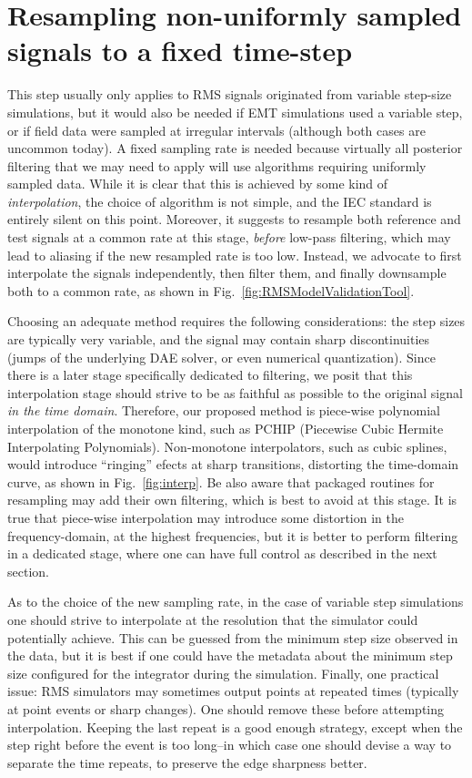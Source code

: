 \documentclass[11pt, a4paper, twoside, titlepage]{article}
\begin{document}
\section{Resampling non-uniformly sampled signals to a fixed time-step}
This step usually only applies to RMS signals originated from variable step-size
simulations, but it would also be needed if EMT simulations used a variable
step, or if field data were sampled at irregular intervals (although both cases
are uncommon today). A fixed sampling rate is needed because virtually all
posterior filtering that we may need to apply will use algorithms requiring
uniformly sampled data. While it is clear that this is achieved by some kind of
\emph{interpolation}, the choice of algorithm is not simple, and the IEC
standard is entirely silent on this point.  Moreover, it suggests to resample
both reference and test signals at a common rate at this stage, \emph{before}
low-pass filtering, which may lead to aliasing if the new resampled rate is too
low.  Instead, we advocate to first interpolate the signals independently, then
filter them, and finally downsample both to a common rate, as shown in
Fig.~\ref{fig:RMSModelValidationTool}.

Choosing an adequate method requires the following considerations: the step
sizes are typically very variable, and the signal may contain sharp
discontinuities (jumps of the underlying DAE solver, or even numerical
quantization). Since there is a later stage specifically dedicated to filtering,
we posit that this interpolation stage should strive to be as faithful as
possible to the original signal \emph{in the time domain}. Therefore, our
proposed method is piece-wise polynomial interpolation of the monotone kind,
such as PCHIP (Piecewise Cubic Hermite Interpolating Polynomials). Non-monotone
interpolators, such as cubic splines, would introduce ``ringing'' efects at
sharp transitions, distorting the time-domain curve, as shown in
Fig.~\ref{fig:interp}. Be also aware that packaged routines for resampling may
add their own filtering, which is best to avoid at this stage.  It is true that
piece-wise interpolation may introduce some distortion in the frequency-domain,
at the highest frequencies, but it is better to perform filtering in a dedicated
stage, where one can have full control as described in the next section.

As to the choice of the new sampling rate, in the case of variable step
simulations one should strive to interpolate at the resolution that the
simulator could potentially achieve. This can be guessed from the minimum step
size observed in the data, but it is best if one could have the metadata about
the minimum step size configured for the integrator during the
simulation. Finally, one practical issue: RMS simulators may sometimes output
points at repeated times (typically at point events or sharp changes). One
should remove these before attempting interpolation. Keeping the last repeat is
a good enough strategy, except when the step right before the event is too
long--in which case one should devise a way to separate the time repeats, to
preserve the edge sharpness better.
\end{document}
